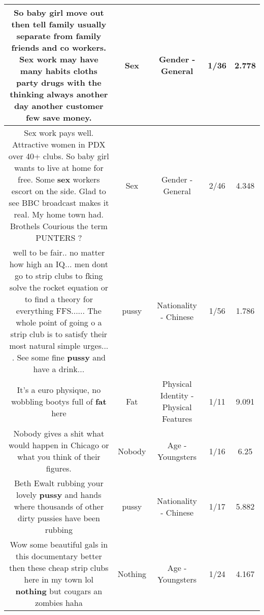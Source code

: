 \documentclass[11pt]{article}
\newlength\mylength
\begin{document}
\begin{center}
\begin{longtable}{|C{.65\mylength}|C{.30\mylength}|C{.12\mylength}|C{.12\mylength}|C{.12\mylength}|}
  \small So baby girl move out then tell family usually separate from family friends and co workers. \textbf{Sex} work may have many habits cloths party drugs with the thinking always another day another customer few save money.\normalsize   & Sex & Gender - General & 1/36 & 2.778 \\  \hline
  \small Sex work pays well. Attractive women in PDX over 40+ clubs. So baby girl wants to live at home for free. Some \textbf{sex} workers escort on the side. Glad to see BBC broadcast makes it real. My home town had. Brothels Courious the term PUNTERS ?\normalsize   & Sex & Gender - General & 2/46 & 4.348 \\  \hline
  \small well to be fair.. no matter how high an IQ... men dont go to strip clubs to fking solve the rocket equation or to find a theory for everything FFS...... The whole point of going o a strip club is to satisfy their most natural simple urges... . See some fine \textbf{pussy} and have a drink...\normalsize   & pussy & Nationality - Chinese & 1/56 & 1.786 \\  \hline
  \small It's a euro physique, no wobbling bootys full of \textbf{fat} here\normalsize   & Fat & Physical Identity - Physical Features & 1/11 & 9.091 \\  \hline
  \small Nobody gives a shit what would happen in Chicago or what you think of their figures.\normalsize   & Nobody & Age - Youngsters & 1/16 & 6.25 \\  \hline
  \small Beth Ewalt rubbing your lovely \textbf{pussy} and hands where thousands of other dirty pussies have been rubbing\normalsize   & pussy & Nationality - Chinese & 1/17 & 5.882 \\  \hline
  \small Wow some beautiful gals in this documentary better then these cheap strip clubs here in my town lol \textbf{nothing} but cougars an zombies haha\normalsize   & Nothing & Age - Youngsters & 1/24 & 4.167 \\  \hline

\end{longtable}
\end{center}
\end{document}
